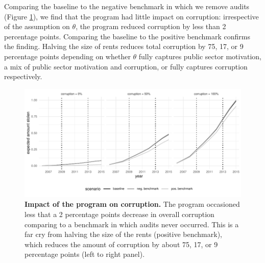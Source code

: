 {Comparing the baseline to the negative benchmark in which we remove audits (Figure \ref{fig:counterfactuals1}), we find that the program had little impact on corruption: irrespective of the assumption on $\theta$, the program reduced corruption by less than 2 percentage points. Comparing the baseline to the positive benchmark confirms the finding. Halving the size of rents reduces total corruption by 75, 17, or 9 percentage points depending on whether $\theta$ fully captures public sector motivation, a mix of public sector motivation and corruption, or fully captures corruption respectively.  



\begin{figure}[H]
    \centering
    \includegraphics{chapters/chapter_2/figures/counterfactuals1.pdf}
    \caption{{\bf Impact of the program on corruption.} The program occasioned less that a 2 percentage points decrease in overall corruption comparing to a benchmark in which audits never occurred. This is a far cry from halving the size of the rents (positive benchmark), which reduces the amount of corruption by about 75, 17, or 9 percentage points (left to right panel).}
    \label{fig:counterfactuals1}
\end{figure}

}
